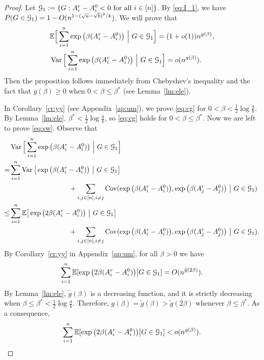 \documentclass{article}
\begin{document}
\begin{proof}
Let $\mathcal{G}_1:=\{G:A^r_i-A^0_i<0\text{~for all~}i\in[n] \}$.
By \eqref{eq:I_1}, we have $P(G\in\mathcal{G}_1)=1-O(n^{1-(\sqrt{a}-\sqrt{b})^2/k})$. We will prove that
\begin{align}
& \mathbb{E} \Big[ \sum_{i=1}^n  \exp\big(\beta (A^r_i-A^0_i) \big) ~\Big|~ G\in\mathcal{G}_1 \Big]
= (1+o(1)) n^{g(\beta)}  , \label{eq:cg} \\
& \operatorname{Var} \Big[ \sum_{i=1}^n  \exp\big(\beta (A^r_i-A^0_i) \big) ~\Big|~ G\in\mathcal{G}_1 \Big]
= o (n^{g(\beta)} ) .  \label{eq:sw}
\end{align}
Then the proposition follows immediately from  Chebyshev's inequality and the fact that $g(\beta)\ge 0$ when $0<\beta\le\beta^\ast$ (see Lemma~\ref{lm:ele}).


In Corollary~\ref{cr:yy} (see Appendix~\ref{ap:um}), we prove \eqref{eq:cg} for $0<\beta<\frac{1}{2}\log\frac{a}{b}$. By Lemma~\ref{lm:ele}, $\beta^\ast<\frac{1}{2}\log\frac{a}{b}$, so \eqref{eq:cg} holds for $0< \beta\le \beta^\ast$.
Now we are left to prove \eqref{eq:sw}. Observe that
\begin{equation} \label{eq:mh1}
\begin{aligned}
& \operatorname{Var} \Big[ \sum_{i=1}^n  \exp\big(\beta (A^r_i-A^0_i) \big) ~\Big|~ G\in\mathcal{G}_1 \Big] \\
= & \sum_{i=1}^n  \operatorname{Var} \big[\exp\big(\beta (A^r_i-A^0_i) \big) ~\big|~ G\in\mathcal{G}_1 \big] \\
& \hspace*{1.2in} + \sum_{i,j\in[n],i\neq j}
\operatorname{Cov}(\exp\big(\beta (A^r_i-A^0_i) \big), \exp\big(\beta (A^r_j-A^0_j) \big) ~\big|~ G\in\mathcal{G}_1 ) \\
\le & \sum_{i=1}^n \mathbb{E} \big[ \exp\big(2\beta (A^r_i-A^0_i) \big) ~\big|~ G\in\mathcal{G}_1 \big] \\
& \hspace*{1.2in} + \sum_{i,j\in[n],i\neq j}
\operatorname{Cov}(\exp\big(\beta (A^r_i-A^0_i) \big), \exp\big(\beta (A^r_j-A^0_j) \big) ~\big|~ G\in\mathcal{G}_1) .
\end{aligned}
\end{equation}
By Corollary~\ref{cr:yy} in Appendix~\ref{ap:um}, for all $\beta>0$ we have
$$
\sum_{i=1}^n \mathbb{E}[ \exp\big(2\beta (A^r_i-A^0_i) \big) \big| G\in\mathcal{G}_1]
= O ( n^{\tilde{g}(2\beta)} ) .
$$
By Lemma~\ref{lm:ele}, $\tilde{g}(\beta)$ is a decreasing function, and it is strictly decreasing when $\beta\le\beta^\ast<\frac{1}{2}\log\frac{a}{b}$. Therefore, $g(\beta)=\tilde{g}(\beta)>\tilde{g}(2\beta)$ whenever $\beta\le\beta^\ast$. As a consequence, 
\begin{equation} \label{eq:mh2}
\sum_{i=1}^n \mathbb{E}[ \exp\big(2\beta (A^r_i-A^0_i) \big) \big| G\in\mathcal{G}_1]
< o ( n^{g(\beta)} ) .
\end{equation}




\end{proof}
\end{document}
